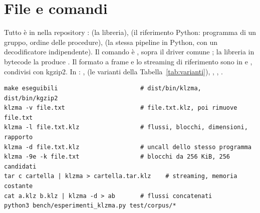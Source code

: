 \appendix
\section{File e comandi}

Tutto è in  nella repository :  (la libreria),  (il riferimento Python: programma di un gruppo, ordine delle procedure),  (la stessa pipeline in Python, con un decodificatore indipendente). Il comando è , sopra il driver comune ; la libreria in bytecode la produce . Il formato a frame e lo streaming di riferimento sono in  e , condivisi con kgzip2. In : ,  (le varianti della Tabella~\ref{tab:varianti}), , , .
\begin{lstlisting}[language={}, basicstyle=\ttfamily\footnotesize]
make eseguibili                       # dist/bin/klzma, dist/bin/kgzip2
klzma -v file.txt                     # file.txt.klz, poi rimuove file.txt
klzma -l file.txt.klz                 # flussi, blocchi, dimensioni, rapporto
klzma -d file.txt.klz                 # uncall dello stesso programma
klzma -9e -k file.txt                 # blocchi da 256 KiB, 256 candidati
tar c cartella | klzma > cartella.tar.klz    # streaming, memoria costante
cat a.klz b.klz | klzma -d > ab       # flussi concatenati
python3 bench/esperimenti_klzma.py test/corpus/*
\end{lstlisting}


